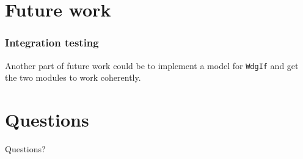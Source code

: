 \documentclass{beamer}
\begin{document}
\section{Future work}
\begin{frame}[fragile]
  \frametitle{Integration testing}
  Another part of future work could be to implement a model for
  \verb!WdgIf! and get the two modules to work coherently.
\end{frame}

\section{Questions}
\begin{frame}
  \Huge{\centerline{Questions?}}
\end{frame}
\end{document}
